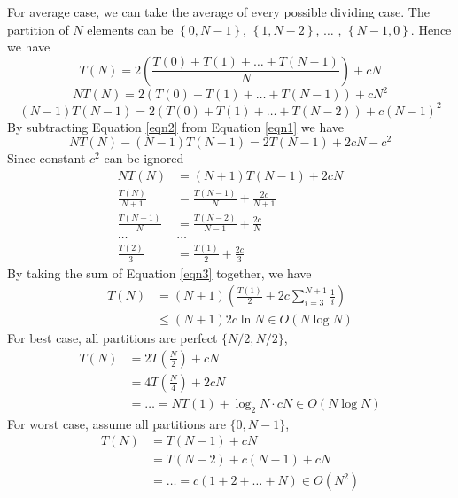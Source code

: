 \begin{exercise}[]
\begin{solution}
  For average case, we can take the average of every possible dividing case. The partition of $N$ elements can be $\left\{0,N-1\right\}$, $\left\{1,N-2\right\}$, $\ldots$ , $\left\{N-1,0\right\}$. Hence we have
  \begin{equation}
      T(N) = 2\left(\frac{T(0)+T(1)+\ldots+T(N-1)}{N}\right) + cN
  \end{equation}
  \begin{equation}
    NT(N) = 2\left({T(0)+T(1)+\ldots+T(N-1)}\right) + cN^2
    \label{eqn1}
  \end{equation}
  \begin{equation}
    (N-1)T(N-1) = 2\left({T(0)+T(1)+\ldots+T(N-2)}\right) + c(N-1)^2
    \label{eqn2}
  \end{equation}
  By subtracting Equation \ref{eqn2} from Equation \ref{eqn1} we have
  \begin{equation}
    NT(N) - (N-1)T(N-1) = 2T(N-1) + 2cN - c^2
  \end{equation}
  Since constant $c^2$ can be ignored
  \begin{equation}
    \begin{aligned}
      NT(N) &= (N+1)T(N-1) +2cN \\
      \frac{T(N)}{N+1} &= \frac{T(N-1)}{N} + \frac{2c}{N+1} \\
      \frac{T(N-1)}{N} &= \frac{T(N-2)}{N-1} + \frac{2c}{N} \\
      \ldots & \ldots \\
      \frac{T(2)}{3} &= \frac{T(1)}{2} + \frac{2c}{3}
    \end{aligned}
    \label{eqn3}
  \end{equation}
  By taking the sum of Equation \ref{eqn3} together, we have
  \begin{equation}
    \begin{aligned}
      T(N) &= (N+1)\left(\frac{T(1)}{2} + 2c \sum_{i=3}^{N+1}\frac{1}{i}\right) \\
      &\le (N+1)2c \ln N \in O(N\log N)
    \end{aligned}
  \end{equation}
  For best case, all partitions are perfect $\{N/2, N/2\}$,
  \begin{equation}
    \begin{aligned}
        T(N) &= 2T(\frac{N}{2}) + cN \\
        &= 4T(\frac{N}{4}) + 2cN \\
        &= \ldots = NT(1) + \log_2{N} \cdot c N \in O(N\log N)
    \end{aligned}
  \end{equation}
  For worst case, assume all partitions are $\{0, N-1\}$,
  \begin{equation}
      \begin{aligned}
          T(N) &= T(N-1) + cN \\
          &= T(N-2) + c(N-1) + cN \\
          &= \ldots = c (1 + 2 + \ldots + N) \in O(N^2)
      \end{aligned}
  \end{equation}
  \end{solution}
  \label{ex6}
\end{exercise}

